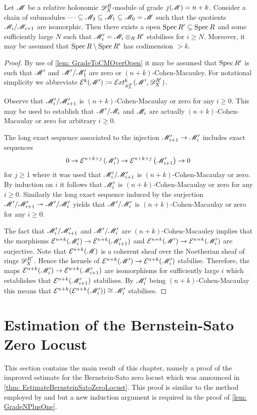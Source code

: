 \begin{lemma}\label{lem: StabilisationChains}
  Let $\mathscr{M}$ be a relative holonomic $\mathscr{D}_X^R$-module of grade $j(\mathscr{M}) = n+k$.
  Consider a chain of submodules $\cdots \subseteq \mathscr{M}_2\subseteq\mathscr{M}_1 \subseteq \mathscr{M}_0 = \mathscr{M} $
  such that the quotients $\mathscr{M}_i/\mathscr{M}_{i+1}$ are isomorphic.
  Then there exists a open $\operatorname{Spec} R' \subseteq \operatorname{Spec} R$ and some sufficiently large $N$ such that $\mathscr{M}_i' = \mathscr{M}_i\otimes_R R'$ stabilises for $i\geq N$. Moreover, it may be assumed that $\operatorname{Spec} R \setminus \operatorname{Spec} R'$ has codimension $>k$.
\end{lemma}
\begin{proof}
  By use of \cref{lem: GradeToCMOverOpen} it may be assumed that $\operatorname{Spec} R'$ is such that $\mathscr{M}'$ and $\mathscr{M}'/\mathscr{M}_1'$ are zero or $(n+k)$-Cohen-Macauley.
  For notational simplicity we abbreviate $\E^{k}(\M') :=\Ex{\D_X^{R'}}{k}(\M',\D_X^{R'})$.

  Observe that $ \mathscr{M}_i'/\mathscr{M}_{i+1}'$ is $(n+k)$-Cohen-Macaulay or zero for any $i\geq 0$.
  This may be used to establish that $\mathscr{M}'/\mathscr{M}_i$ and $\mathscr{M}_i$ are actually $(n+k)$-Cohen-Macaulay or zero for arbitrary $i\geq 0$.

  The long exact sequence associated to the injection $ \mathscr{M}_{i+1}'\to \mathscr{M}_i'$ includes exact sequences
  $$0 \to  \mathcal{E}^{n+k+j}\left(\mathscr{M}_i'\right) \to \mathcal{E}^{n+k +j}\left( \mathscr{M}_{i+1}'\right)\to 0$$
  for $j\geq 1$ where it was used that $\mathscr{M}_i'/\mathscr{M}_{i+1}'$ is $(n+k)$-Cohen-Macaulay or zero.
  By induction on $i$ it follows that $\mathscr{M}_i'$ is $(n+k)$-Cohen-Macaulay or zero for any $i\geq 0$.
  Similarly the long exact sequence induced by the surjection $\mathscr{M}'/\mathscr{M}_{i+1}' \twoheadrightarrow \mathscr{M}'/\mathscr{M}_i'$ yields that $\mathscr{M}'/\mathscr{M}_i'$ is $(n+k)$-Cohen-Macaulay or zero for any $i\geq 0$.


  The fact that $\mathscr{M}_i'/\mathscr{M}_{i+1}'$ and $\mathscr{M}'/\mathscr{M}_{i}'$ are $(n+k)$-Cohen-Macauley implies that the morphisms $\mathcal{E}^{n+k}(\mathscr{M}_i') \to  \mathcal{E}^{n+k}(\mathscr{M}_{i+1}')$ and $\mathcal{E}^{n+k}(\mathscr{M}') \to \mathcal{E}^{n+k} (\mathscr{M}_i')$ are surjective.
  Note that $\mathcal{E}^{n+k}(\mathscr{M})$ is a coherent sheaf over the Noetherian sheaf of rings $\mathscr{D}_X^{R'}$.
  Hence the kernels of $\mathcal{E}^{n+k}(\mathscr{M}') \to \mathcal{E}^{n+k} (\mathscr{M}_i')$ stabilise.
  Therefore, the maps $\mathcal{E}^{n+k}(\mathscr{M}_i') \to  \mathcal{E}^{n+k}(\mathscr{M}_{i+1}')$ are isomorphisms for sufficiently large $i$ which establishes that $\mathcal{E}^{n+k}(\mathscr{M}_{i+1}')$ stabilises.
  By $ \mathscr{M}_i'$ being $(n+k)$-Cohen-Macaulay this means that $\mathcal{E}^{n+k}(\mathcal{E}^{n+k}(\mathscr{M}_i')) \cong \mathscr{M}_i'$ stabilises.
\end{proof}
\section{Estimation of the Bernstein-Sato Zero Locust}\label{sec: EstimationBSZeroLocust}
This section contains the main result of this chapter, namely a proof of the improved estimate for the Bernstein-Sato zero locust which was announced in \cref{thm: EstimateBernsteinSatoZeroLocust}.
This proof is similar to the method employed by \cite{lichtin1989poles} and \cite{kashiwara1976b} but a new induction argument is required in the proof of \cref{lem: GradeNPlusOne}.\\

